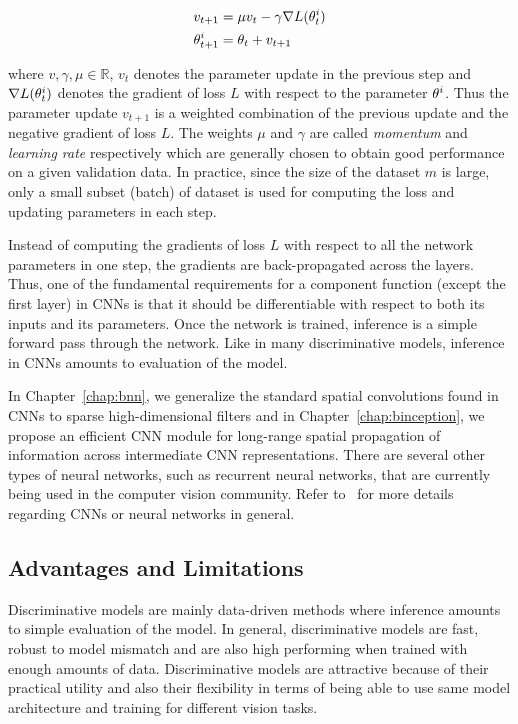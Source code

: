 \begin{align}
\begin{split}
v_{t+1} &= \mu v_t - \gamma \nabla L(\mathbf{\theta}^i_t)
\\
\mathbf{\theta}^i_{t+1} &= \mathbf{\theta}_t + v_{t+1}
\end{split}
\end{align}

where $v, \gamma, \mu \in \mathbb{R}$,
$v_t$ denotes the parameter update in the previous step and
$\nabla L(\mathbf{\theta}^i_t)$ denotes the gradient of loss $L$ with respect
to the parameter $\mathbf{\theta}^i$. Thus the parameter update $v_{t+1}$ is a weighted
combination of the previous update and the negative gradient of loss $L$.
The weights $\mu$ and $\gamma$ are called \textit{momentum} and
\textit{learning rate} respectively which are generally chosen to obtain
good performance on a given validation data.
In practice, since the size of the dataset $m$ is large, only a small subset (batch)
of dataset is used for computing the loss and updating parameters in each step.

Instead of computing the gradients of loss $L$ with respect to all the network parameters
in one step, the gradients are back-propagated across the layers.
Thus, one of the fundamental requirements for a component function (except the first layer)
in CNNs is that it should be differentiable with respect to both its inputs
and its parameters. Once the network is trained,
inference is a simple forward pass through the network. Like in many discriminative
models, inference in CNNs amounts to evaluation of the model.

In Chapter~\ref{chap:bnn}, we generalize the standard spatial convolutions found
in CNNs to sparse high-dimensional filters and in Chapter~\ref{chap:binception},
we propose an efficient CNN module for long-range spatial propagation of information
across intermediate CNN representations. There are several other types of
neural networks, such as recurrent neural networks,
that are currently being used in the computer vision community.
Refer to~\cite{Goodfellow-et-al-2016-Book,888} for more details regarding CNNs or
neural networks in general.

\subsection{Advantages and Limitations}

Discriminative models are mainly data-driven methods where inference amounts to
simple evaluation of the model. In general, discriminative models are
fast, robust to model mismatch and are also high performing when
trained with enough amounts of data. Discriminative models are attractive
because of their practical utility and also their flexibility in terms of
being able to use same model architecture and training for different vision tasks.


